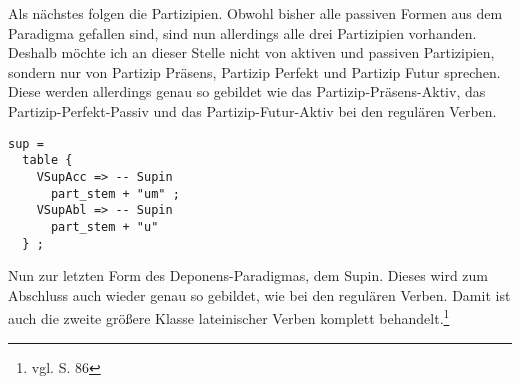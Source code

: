 Als nächstes folgen die Partizipien. Obwohl bisher alle passiven Formen aus dem Paradigma gefallen sind, sind nun allerdings alle drei Partizipien vorhanden. Deshalb möchte ich an dieser Stelle nicht von aktiven und passiven Partizipien, sondern nur von Partizip Präsens, Partizip Perfekt und Partizip Futur sprechen. Diese werden allerdings genau so gebildet wie das Partizip-Präsens-Aktiv, das Partizip-Perfekt-Passiv und das Partizip-Futur-Aktiv bei den regulären Verben. \par
\begin{lstlisting}[float=h!tp,caption={Ausschnitt aus der Funktion \texttt{mkDeponent} um Supin-Verbformen zu bilden (vgl. \textbf{ResLat.gf})},label={GF-Res-MkDeponent-Sup},basicstyle=\small]
sup = 
  table {
    VSupAcc => -- Supin
      part_stem + "um" ;
    VSupAbl => -- Supin
      part_stem + "u" 
  } ;
\end{lstlisting}
Nun zur letzten Form des Deponens-Paradigmas, dem Supin. Dieses wird zum Abschluss auch wieder genau so gebildet, wie bei den regulären Verben. Damit ist auch die zweite größere Klasse lateinischer Verben komplett behandelt.\footnote{vgl. \cite{BAYER-LINDAUER1994} S. 86} \par
